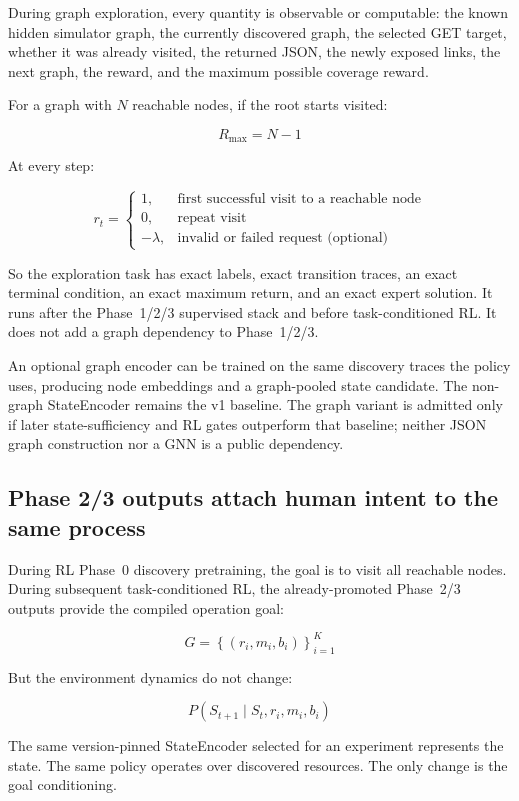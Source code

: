 \documentclass{article}
\begin{document}
During graph exploration, every quantity is observable or computable: the known hidden simulator graph, the currently discovered graph, the selected GET target, whether it was already visited, the returned JSON, the newly exposed links, the next graph, the reward, and the maximum possible coverage reward.

For a graph with $N$ reachable nodes, if the root starts visited:

$$
R_{\max} = N - 1
$$

At every step:

$$
r_t = \begin{cases}
  1, & \text{first successful visit to a reachable node} \\
  0, & \text{repeat visit} \\
  -\lambda, & \text{invalid or failed request (optional)}
\end{cases}
$$

So the exploration task has exact labels, exact transition traces, an exact terminal condition, an exact maximum return, and an exact expert solution. It runs after the Phase~1/2/3 supervised stack and before task-conditioned RL. It does not add a graph dependency to Phase~1/2/3.

An optional graph encoder can be trained on the same discovery traces the policy uses, producing node embeddings and a graph-pooled state candidate. The non-graph StateEncoder remains the v1 baseline. The graph variant is admitted only if later state-sufficiency and RL gates outperform that baseline; neither JSON graph construction nor a GNN is a public dependency.

\subsection*{Phase 2/3 outputs attach human intent to the same process}

During RL Phase~0 discovery pretraining, the goal is to visit all reachable nodes. During subsequent task-conditioned RL, the already-promoted Phase~2/3 outputs provide the compiled operation goal:

$$
G = \left\{\left(r_i, m_i, b_i\right)\right\}_{i=1}^K
$$

But the environment dynamics do not change:

$$
P\left(S_{t+1} \mid S_t, r_i, m_i, b_i\right)
$$

The same version-pinned StateEncoder selected for an experiment represents the state. The same policy operates over discovered resources. The only change is the goal conditioning.
\end{document}
